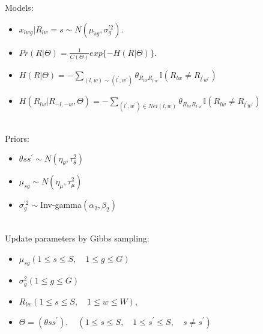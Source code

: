 \documentclass[10 pt]{beamer}
\begin{document}
\begin{frame}
Models:
\begin{itemize}
	\item $x_{lwg} | R_{lw} = s  \sim N(\mu_{sg}, \sigma^{\prime 2}_g) $.
	\item $Pr(R|\Theta) = \frac{1}{C(\Theta)}exp\{-H(R|\Theta)\}$.
	\item $H(R|\Theta) = -\sum_{(l,w)\sim(l^{\prime},w^{\prime})}\theta_{R_{lw}R_{l^{\prime}w^{\prime}}} \mathbb{I}(R_{lw} \neq R_{l^{\prime}w^{\prime}})$
	\item $H(R_{lw}|R_{-l,-w},\Theta) = -\sum_{(l^{\prime},w^{\prime})\in Nei(l,w)}\theta_{R_{lw}R_{l^{\prime}w^{\prime}}} \mathbb{I}(R_{lw} \neq R_{l^{\prime}w^{\prime}})$
\end{itemize}
~\\
Priors:
\begin{itemize}
\item $\theta{ss^{\prime}} \sim N(\eta_{\theta}, \tau_{\theta}^2)\quad$

\item $\mu_{sg} \sim N(\eta_{\mu}, \tau_{\mu}^2)$

\item $\sigma_g^{\prime 2} \sim $Inv-gamma$(\alpha_2,\beta_2)$
\end{itemize}
~\\
Update parameters by Gibbs sampling:
\begin{itemize}
	\item $\mu_{sg}(1\le s \le S, \quad 1\le g \le G)$
	\item $\sigma_g^2(1\le g \le G)$
	\item $R_{lw} (1\le s \le S, \quad 1\le w \le W)$,
	\item $\Theta = (\theta{ss^{\prime}}),\quad  (1\le s \le S, \quad 1\le s^{\prime} \le S,\quad s \neq s^{\prime})\quad$
\end{itemize}
\end{frame}
\end{document}
